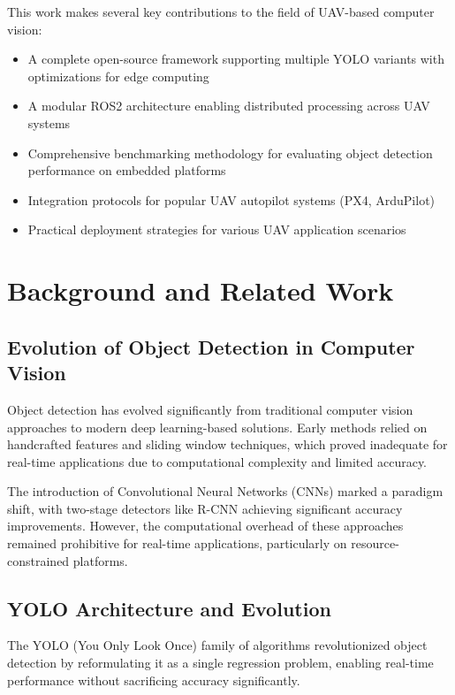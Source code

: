 \documentclass[11pt,a4paper]{article}
\begin{document}
This work makes several key contributions to the field of UAV-based computer vision:

\begin{itemize}[itemsep=0.5em]
    \item A complete open-source framework supporting multiple YOLO variants with optimizations for edge computing
    \item A modular ROS2 architecture enabling distributed processing across UAV systems
    \item Comprehensive benchmarking methodology for evaluating object detection performance on embedded platforms
    \item Integration protocols for popular UAV autopilot systems (PX4, ArduPilot)
    \item Practical deployment strategies for various UAV application scenarios
\end{itemize}

\section{Background and Related Work}

\subsection{Evolution of Object Detection in Computer Vision}

Object detection has evolved significantly from traditional computer vision approaches to modern deep learning-based solutions. Early methods relied on handcrafted features and sliding window techniques, which proved inadequate for real-time applications due to computational complexity and limited accuracy.

The introduction of Convolutional Neural Networks (CNNs) marked a paradigm shift, with two-stage detectors like R-CNN achieving significant accuracy improvements. However, the computational overhead of these approaches remained prohibitive for real-time applications, particularly on resource-constrained platforms.

\subsection{YOLO Architecture and Evolution}

The YOLO (You Only Look Once) family of algorithms revolutionized object detection by reformulating it as a single regression problem, enabling real-time performance without sacrificing accuracy significantly.
\end{document}
